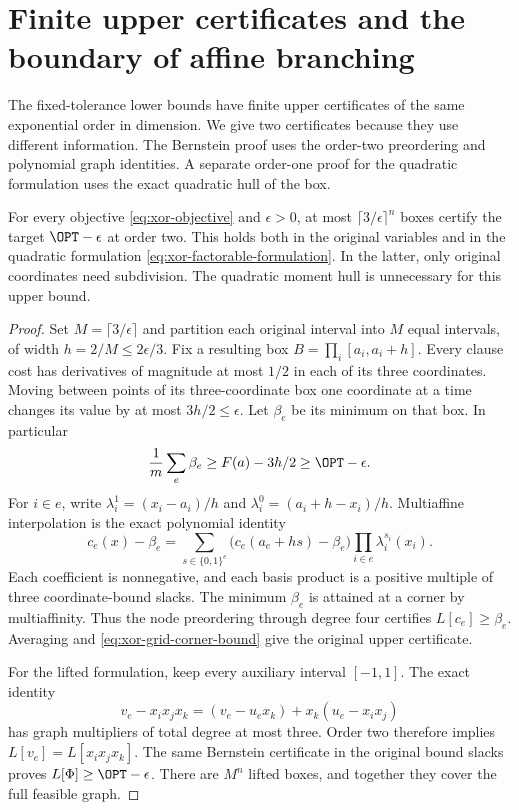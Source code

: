 \section{Finite upper certificates and the boundary of affine branching}
\label{sec:xor-upper-affine}
The fixed-tolerance lower bounds have finite upper certificates of the
same exponential order in dimension. We give two certificates because
they use different information. The Bernstein proof uses the order-two
preordering and polynomial graph identities. A separate order-one proof
for the quadratic formulation uses the exact quadratic hull of the box.

\begin{proposition}
\label{prop:xor-bernstein-upper}
For every objective \eqref{eq:xor-objective} and $\epsilon>0$, at most
$\lceil3/\epsilon\rceil^n$ boxes certify the target $\OPT-\epsilon$
at order two. This holds both in the original variables and in the
quadratic formulation \eqref{eq:xor-factorable-formulation}. In the latter,
only original coordinates need subdivision. The quadratic moment hull
is unnecessary for this upper bound.
\end{proposition}
\begin{proof}
Set $M=\lceil3/\epsilon\rceil$ and partition each original interval
into $M$ equal intervals, of width $h=2/M\le2\epsilon/3$. Fix a resulting
box $B=\prod_i[a_i,a_i+h]$. Every clause cost has derivatives of
magnitude at most $1/2$ in each of its three coordinates. Moving between
points of its three-coordinate box one coordinate at a time changes its
value by at most $3h/2\le\epsilon$. Let $\beta_e$ be its minimum on
that box. In particular
\begin{equation}\label{eq:xor-grid-corner-bound}
 \frac1m\sum_e\beta_e\ge F(a)-3h/2\ge\OPT-\epsilon.
\end{equation}
For $i\in e$, write $\lambda_i^1=(x_i-a_i)/h$ and
$\lambda_i^0=(a_i+h-x_i)/h$. Multiaffine interpolation is the exact
polynomial identity
\begin{equation}\label{eq:xor-bernstein-identity}
 c_e(x)-\beta_e=
 \sum_{s\in\{0,1\}^e}\bigl(c_e(a_e+hs)-\beta_e\bigr)
       \prod_{i\in e}\lambda_i^{s_i}(x_i).
\end{equation}
Each coefficient is nonnegative, and each basis product is a positive
multiple of three coordinate-bound slacks. The minimum $\beta_e$ is
attained at a corner by multiaffinity. Thus the node preordering through
degree four certifies $L[c_e]\ge\beta_e$. Averaging and
\eqref{eq:xor-grid-corner-bound} give the original upper certificate.

For the lifted formulation, keep every auxiliary interval $[-1,1]$.
The exact identity
\begin{equation}\label{eq:bernstein-graph-transfer}
 v_e-x_ix_jx_k=(v_e-u_ex_k)+x_k(u_e-x_ix_j)
\end{equation}
has graph multipliers of total degree at most three. Order two therefore
implies $L[v_e]=L[x_ix_jx_k]$. The same Bernstein certificate in the
original bound slacks proves $L[\Phi]\ge\OPT-\epsilon$. There are
$M^n$ lifted boxes, and together they cover the full feasible graph.
\end{proof}

